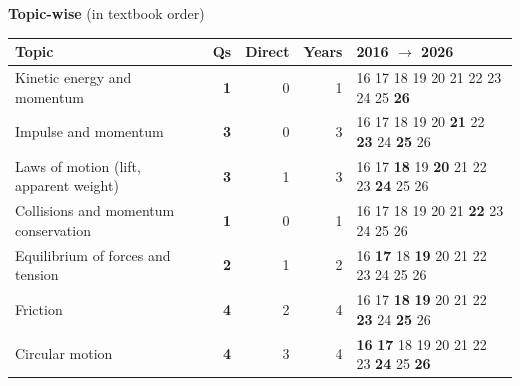 {\small\textbf{\color{crimson}Topic-wise} (in textbook order)\par\smallskip
\begin{tabularx}{\linewidth}{@{}>{\raggedright\arraybackslash}Xrrrl@{}}\toprule
Topic & Qs & Direct & Years & 2016 $\rightarrow$ 2026\\\midrule
Kinetic energy and momentum & \textbf{1} & 0 & 1 & {\scriptsize {\color{gray!45}16} {\color{gray!45}17} {\color{gray!45}18} {\color{gray!45}19} {\color{gray!45}20} {\color{gray!45}21} {\color{gray!45}22} {\color{gray!45}23} {\color{gray!45}24} {\color{gray!45}25} \textbf{26}}\\
Impulse and momentum & \textbf{3} & 0 & 3 & {\scriptsize {\color{gray!45}16} {\color{gray!45}17} {\color{gray!45}18} {\color{gray!45}19} {\color{gray!45}20} \textbf{21} {\color{gray!45}22} \textbf{23} {\color{gray!45}24} \textbf{25} {\color{gray!45}26}}\\
Laws of motion (lift, apparent weight) & \textbf{3} & 1 & 3 & {\scriptsize {\color{gray!45}16} {\color{gray!45}17} \textbf{18} {\color{gray!45}19} \textbf{20} {\color{gray!45}21} {\color{gray!45}22} {\color{gray!45}23} \textbf{24} {\color{gray!45}25} {\color{gray!45}26}}\\
Collisions and momentum conservation & \textbf{1} & 0 & 1 & {\scriptsize {\color{gray!45}16} {\color{gray!45}17} {\color{gray!45}18} {\color{gray!45}19} {\color{gray!45}20} {\color{gray!45}21} \textbf{22} {\color{gray!45}23} {\color{gray!45}24} {\color{gray!45}25} {\color{gray!45}26}}\\
Equilibrium of forces and tension & \textbf{2} & 1 & 2 & {\scriptsize {\color{gray!45}16} \textbf{17} {\color{gray!45}18} \textbf{19} {\color{gray!45}20} {\color{gray!45}21} {\color{gray!45}22} {\color{gray!45}23} {\color{gray!45}24} {\color{gray!45}25} {\color{gray!45}26}}\\
Friction & \textbf{4} & 2 & 4 & {\scriptsize {\color{gray!45}16} {\color{gray!45}17} \textbf{18} \textbf{19} {\color{gray!45}20} {\color{gray!45}21} {\color{gray!45}22} \textbf{23} {\color{gray!45}24} \textbf{25} {\color{gray!45}26}}\\
Circular motion & \textbf{4} & 3 & 4 & {\scriptsize \textbf{16} \textbf{17} {\color{gray!45}18} {\color{gray!45}19} {\color{gray!45}20} {\color{gray!45}21} {\color{gray!45}22} {\color{gray!45}23} \textbf{24} {\color{gray!45}25} \textbf{26}}\\
\bottomrule\end{tabularx}}\par\medskip

